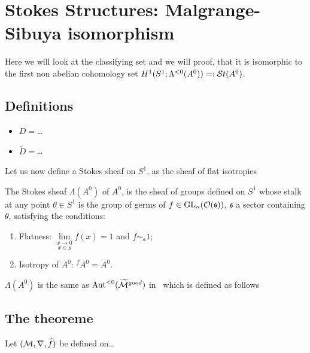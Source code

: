 \section{Stokes Structures: Malgrange-Sibuya isomorphism}
\begin{comment}
  \begin{itemize}
    \item \cite{Loday1994} Thm I.2.1
    \item \cite{Loday2014} Thm. 4.3.9, on p. 78
    \item \cite{sabbah2007isomonodromic} Thm II.6.2
  \end{itemize}
\end{comment}
Here we will look at the classifying set and we will proof, that it is
isomorphic \TODO[as\dots] to the first non abelian cohomology set
$H^1(S^1;\Lambda^{<0}(A^0))=:\mathcal{S}{}t(A^0)$.

\subsection{Definitions}
\begin{itemize}
  \item $D=$\dots
  \item $\tilde D=$\dots
\end{itemize}

Let us now define a Stokes sheaf on $S^1$, as the sheaf of flat
isotropies\TODO[\dots]
\begin{defn}
  The Stokes sheaf $\Lambda(A^0)$ of $A^0$, is the sheaf of groups defined on
  $S^1$ whose stalk at any point $\theta\in S^1$ is the group of germs of
  $f\in\operatorname{GL}_n(\mathcal{O}(\mathfrak{s}))$, $\mathfrak{s}$ a sector containing $\theta$, satisfying
  the conditions:
  \begin{enumerate}
    \item Flatness: $\underset{x\in\mathfrak{s}}{\underset{x\to0}{\lim}}f(x)=1$
      and $f\sim_{\mathfrak{s}} 1$;
    \item Isotropy of $A^0$: ${}^f\!A^0=A^0$.
  \end{enumerate}
  \begin{rem}
    $\Lambda(A^0)$ is the same as $\operatorname{Aut}^{<0}(\widetilde{\mathcal{M}}^{good})$
    in~\cite{sabbah2007isomonodromic} which is defined as follows \TODO
  \end{rem}
\end{defn}

\subsection{The theoreme}
Let $(\mathcal{M},\nabla,\widehat f)$ be defined on\dots

